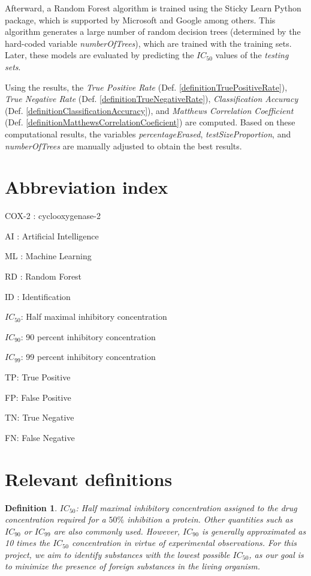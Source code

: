 \documentclass[12pt,letterpaper]{article}
\newtheorem{definition}{Definition}
\begin{document}
\begin{multicols}{2}
Afterward, a Random Forest algorithm is trained using the Sticky Learn \cite{PythonPackageStickitLearn} Python package, which is supported by Microsoft and Google among others. This algorithm generates a large number of random decision trees (determined by the hard-coded variable \emph{numberOfTrees}), which are trained with the training sets. Later, these models are evaluated by predicting the $IC_{50}$ values of the \emph{testing sets}.

Using the results, the \emph{True Positive Rate} (Def. \ref{definitionTruePositiveRate}), \emph{True Negative Rate} (Def. \ref{definitionTrueNegativeRate}), \emph{Classification Accuracy} (Def. \ref{definitionClassificationAccuracy}), and \emph{Matthews Correlation Coefficient} (Def. \ref{definitionMatthewsCorrelationCoeficient}) are computed. Based on these computational results, the variables \emph{percentageErased}, \emph{testSizeProportion}, and \emph{numberOfTrees} are manually adjusted to obtain the best results.



 
\section{Abbreviation index}
COX-2 : cyclooxygenase-2\par
AI : Artificial Intelligence\par
ML : Machine Learning\par
RD : Random Forest\par
ID : Identification\par
$IC_{50}$: Half maximal inhibitory concentration \par
$IC_{90}$: 90 percent inhibitory concentration \par
$IC_{99}$: 99 percent inhibitory concentration \par
TP: True Positive\par
FP: False Positive\par
TN: True Negative\par
FN: False Negative
\appendix
\section{Relevant definitions}
\begin{definition}\label{definitionIC50}
$IC_{50}$: Half maximal inhibitory concentration assigned to the drug concentration required for a $50\%$ inhibition a protein. Other quantities such as $IC_{90}$ or $IC_{99}$ are also commonly used. However, $IC_{90}$ is generally approximated as 10 times the $IC_{50}$ concentration in virtue of experimental observations\cite{BookIC50}. For this project, we aim to identify substances with the lowest possible $IC_{50}$, as our goal is to minimize the presence of foreign substances in the living organism.
\end{definition}


\end{multicols}
\end{document}
